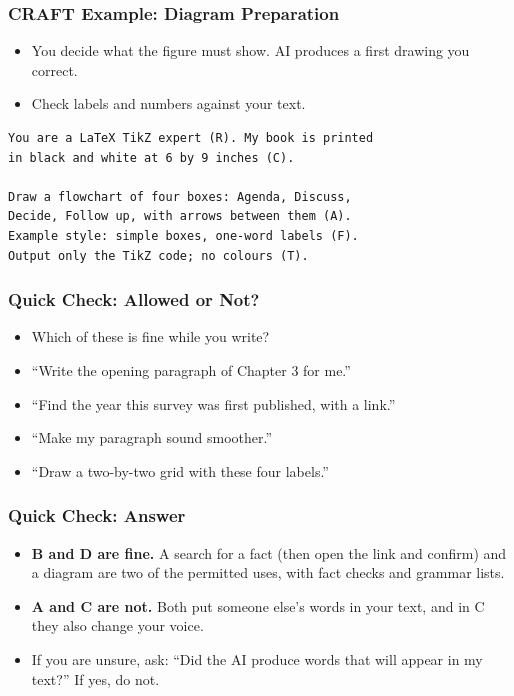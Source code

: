 \begin{frame}[fragile]\frametitle{CRAFT Example: Diagram Preparation}
\begin{itemize}
\item You decide what the figure must show. AI produces a first drawing you correct.
\item Check labels and numbers against your text.
\end{itemize}
\begin{lstlisting}[language=HTML]
You are a LaTeX TikZ expert (R). My book is printed
in black and white at 6 by 9 inches (C).

Draw a flowchart of four boxes: Agenda, Discuss,
Decide, Follow up, with arrows between them (A).
Example style: simple boxes, one-word labels (F).
Output only the TikZ code; no colours (T).
\end{lstlisting}
\end{frame}

\begin{frame}[fragile]\frametitle{Quick Check: Allowed or Not?}
\begin{itemize}
\item Which of these is fine while you write?
\item[A.] ``Write the opening paragraph of Chapter 3 for me.''
\item[B.] ``Find the year this survey was first published, with a link.''
\item[C.] ``Make my paragraph sound smoother.''
\item[D.] ``Draw a two-by-two grid with these four labels.''
\end{itemize}
\end{frame}

\begin{frame}[fragile]\frametitle{Quick Check: Answer}
\begin{itemize}
\item \textbf{B and D are fine.} A search for a fact (then open the link and confirm) and a diagram are two of the permitted uses, with fact checks and grammar lists.
\item \textbf{A and C are not.} Both put someone else's words in your text, and in C they also change your voice.
\item If you are unsure, ask: ``Did the AI produce words that will appear in my text?'' If yes, do not.
\end{itemize}
\end{frame}


